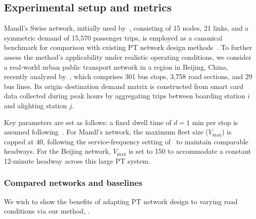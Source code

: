 \documentclass[a4paper,fleqn]{cas-sc}
\newcommand\todoi[1]{\todo[inline]{#1}}
\begin{document}
\subsection{Experimental setup and metrics}\label{sec:setup}
Mandl’s Swiss network, initially used by~\cite{mandl1980evaluation}, consisting of 15 nodes, 21 links, and a symmetric demand of 15{,}570 passenger trips, is employed as a canonical benchmark for comparison with existing PT network design methods~\citep{liang2025novel, ahern2022approximate}. To further assess the method’s applicability under realistic operating conditions, we consider a real-world urban public transport network in a region in Beijing, China, recently analyzed by~\cite{wu2024multi}, which comprises 301 bus stops, 3,758 road sections, and 29 bus lines. Its origin--destination demand matrix is constructed from smart card data collected during peak hours by aggregating trips between boarding station $i$ and alighting station $j$. 

Key parameters are set as follows: a fixed dwell time of $d=1$ min per stop is assumed following~\cite{chen2022TRSC}.
For Mandl’s network, the maximum fleet size ($V_{\max}$) is capped at 40, following the service-frequency setting of~\cite{ahern2022approximate} to maintain comparable headways. 
For the Beijing network, $V_{\max}$ is set to 150 to accommodate a constant 12-minute headway across this large PT system. 

\subsubsection{Compared networks and baselines}
\label{sec:compared-PT-networks}

We wish to show the benefits of adapting PT network design  to varying road conditions via our method, .
\end{document}
